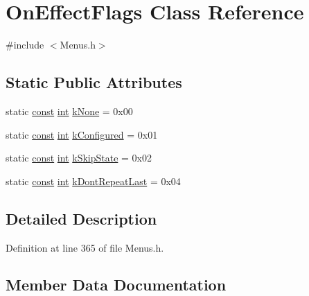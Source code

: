 \hypertarget{class_on_effect_flags}{}\section{On\+Effect\+Flags Class Reference}
\label{class_on_effect_flags}


{\ttfamily \#include $<$Menus.\+h$>$}

\subsection*{Static Public Attributes}
\begin{DoxyCompactItemize}
\item 
static \hyperlink{getopt1_8c_a2c212835823e3c54a8ab6d95c652660e}{const} \hyperlink{xmltok_8h_a5a0d4a5641ce434f1d23533f2b2e6653}{int} \hyperlink{class_on_effect_flags_acfc5e2001fbe03eeda04c7ee4dd7e6d0}{k\+None} = 0x00
\item 
static \hyperlink{getopt1_8c_a2c212835823e3c54a8ab6d95c652660e}{const} \hyperlink{xmltok_8h_a5a0d4a5641ce434f1d23533f2b2e6653}{int} \hyperlink{class_on_effect_flags_a7552392a395f22f702c1e2c28d2b6020}{k\+Configured} = 0x01
\item 
static \hyperlink{getopt1_8c_a2c212835823e3c54a8ab6d95c652660e}{const} \hyperlink{xmltok_8h_a5a0d4a5641ce434f1d23533f2b2e6653}{int} \hyperlink{class_on_effect_flags_a14f35f5193a26b0ca79db2b83a4bee2a}{k\+Skip\+State} = 0x02
\item 
static \hyperlink{getopt1_8c_a2c212835823e3c54a8ab6d95c652660e}{const} \hyperlink{xmltok_8h_a5a0d4a5641ce434f1d23533f2b2e6653}{int} \hyperlink{class_on_effect_flags_abec1568e4528abe0fccf301b10e715b6}{k\+Dont\+Repeat\+Last} = 0x04
\end{DoxyCompactItemize}


\subsection{Detailed Description}


Definition at line 365 of file Menus.\+h.



\subsection{Member Data Documentation}
